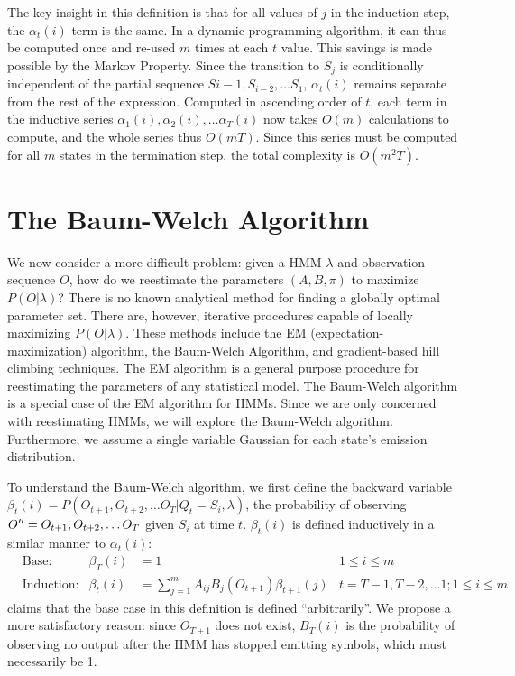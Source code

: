 The key insight in this definition is that for all values of $j$ in the induction step, the $\alpha_t(i)$ term is the same. In a dynamic programming algorithm, it can thus be computed once and re-used $m$ times at each $t$ value. This savings is made possible by the Markov Property. Since the transition to $S_{j}$ is conditionally independent of the partial sequence $S{i-1}, S_{i-2}, \dots S_{1}$, $\alpha_t(i)$ remains separate from the rest of the expression. Computed in ascending order of $t$, each term in the inductive series $\alpha_1(i), \alpha_2(i), \dots \alpha_T(i)$ now takes $O(m)$ calculations to compute, and the whole series thus $O(mT)$. Since this series must be computed for all $m$ states in the termination step, the total complexity is $O(m^2T)$.

\section{The Baum-Welch Algorithm}
We now consider a more difficult problem: given a HMM $\lambda$ and observation sequence $O$, how do we reestimate the parameters $(A, B, \pi)$ to maximize $P(O|\lambda)$? There is no known analytical method for finding a globally optimal parameter set. There are, however, iterative procedures capable of locally maximizing $P(O|\lambda)$. These methods include the EM (expectation-maximization) algorithm, the Baum-Welch Algorithm, and gradient-based hill climbing techniques. The EM algorithm is a general purpose procedure for reestimating the parameters of any statistical model. The Baum-Welch algorithm is a special case of the EM algorithm for HMMs. Since we are only concerned with reestimating HMMs, we will explore the Baum-Welch algorithm. Furthermore, we assume a single variable Gaussian for each state's emission distribution.

To understand the Baum-Welch algorithm, we first define the backward variable $\beta_t(i) = P(O_{t+1}, O_{t+2}, \dots O_{T}|Q_t = S_i, \lambda)$, the probability
of observing $O'' = O_{t+1}, \\ O_{t+2}, \dots O_{T}$ given $S_i$ at time $t$. $\beta_t(i)$ is defined inductively in a similar manner to $\alpha_t(i)$:
\begin{align*}
	& \text{Base:} & \beta_T(i) & = 1 & 1 \leq i \leq m \\
	& \text{Induction:} & \beta_t(i) & = \sum_{j=1}^m A_{ij}B_j(O_{t+1})\beta_{t+1}(j) & t = T-1, T-2, \dots 1; 1 \leq i \leq m
\end{align*}
\citeauthor{rabinerpi89} claims that the base case in this definition is defined ``arbitrarily''. We propose a more satisfactory reason: since $O_{T+1}$ does not exist, $B_T(i)$ is the probability of observing no output after the HMM has stopped emitting symbols, which must necessarily be 1.

